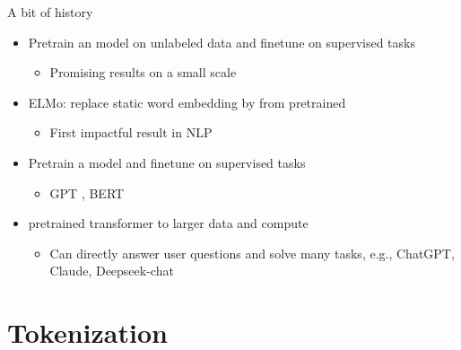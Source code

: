 \documentclass[usenames,dvipsnames,notes,11pt,aspectratio=169,hyperref={colorlinks=true, linkcolor=blue}]{beamer}
\begin{document}
\begin{frame}
    {A bit of history}
    \begin{itemize}[<+->]
        \item Pretrain an  model on unlabeled data and finetune on supervised tasks
            \begin{itemize}[<.->]
                \item Promising results on a small scale
            \end{itemize}
        \item ELMo: replace static word embedding by  from pretrained  
            \begin{itemize}[<.->]
                \item First impactful result in NLP
            \end{itemize}
        \item Pretrain a  model and finetune on supervised tasks 
            \begin{itemize}[<.->]
                \item GPT ,
                    BERT 
            \end{itemize}
        \item {} pretrained transformer to larger data and compute
            \begin{itemize}[<.->]
                \item Can directly answer user questions and solve many tasks, e.g., ChatGPT, Claude, Deepseek-chat
            \end{itemize}
    \end{itemize}
\end{frame}

\section{Tokenization}
\end{document}
